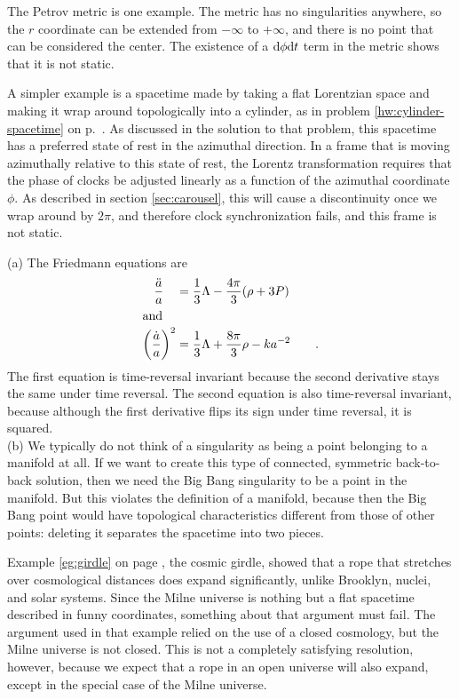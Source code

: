 
The Petrov metric is one example. The metric has no singularities anywhere, so the $r$ coordinate
can be extended from $-\infty$ to $+\infty$, and there is no point that can be considered the center.
The existence of a $\textup{d}\phi \textup{d} t$ term in the metric shows that it is not static.

A simpler example is a spacetime made by taking a flat Lorentzian space and making it wrap around topologically
into a cylinder, as in problem \ref{hw:cylinder-spacetime} on p.~\pageref{hw:cylinder-spacetime}. As discussed
in the solution to that problem, this spacetime has a preferred state of rest in the azimuthal direction.
In a frame that is moving azimuthally relative to this state of rest, the Lorentz transformation requires that
the phase of clocks be adjusted linearly as a function of the azimuthal coordinate $\phi$. As described
in section \ref{sec:carousel}, this will cause a discontinuity once we wrap around by $2\pi$, and therefore
clock synchronization fails, and this frame is not static.


(a) The Friedmann equations are
\begin{align*}
  \frac{\ddot{a}}{a}   \quad          &= \frac{1}{3}\Lambda - \frac{4\pi}{3}(\rho+3P) \\
\intertext{and}
  \left(\frac{\dot{a}}{a}\right)^2    &= \frac{1}{3}\Lambda + \frac{8\pi}{3}\rho-k a^{-2} \qquad .
\end{align*}
The first equation is time-reversal invariant because the second derivative stays the same under time reversal.
The second equation is also time-reversal invariant, because although the first derivative flips its sign
under time reversal, it is squared.\\
(b) We typically do not think of a singularity as being a point belonging to a manifold at all. If we want to
create this type of connected, symmetric back-to-back solution, then we need the Big Bang singularity to be
a point in the manifold. But this violates the definition of a manifold, because then the Big Bang point would
have topological characteristics different from those of other points: deleting it separates the spacetime into
two pieces.

Example \ref{eg:girdle} on page \pageref{eg:girdle}, the cosmic girdle, showed that a rope
that stretches over cosmological distances does expand significantly, unlike Brooklyn, nuclei, and solar systems.
Since the Milne universe is nothing but a flat spacetime described in funny coordinates, something about
that argument must fail. The argument used in that example relied on the use of a closed cosmology,
but the Milne universe is not closed. This is not a completely satisfying resolution, however, because
we expect that a rope in an open universe will also expand, except in the special case of the Milne universe.

